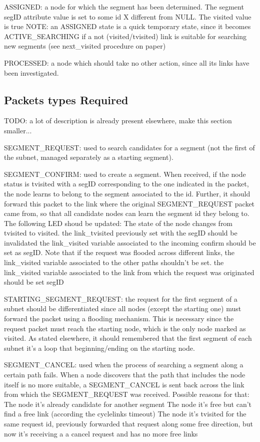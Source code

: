 \documentclass[conference]{IEEEtran}
\begin{document}
ASSIGNED: a node for which the segment has been determined.  The
segment segID attribute value is set to some id X different from NULL.
The visited value is true NOTE: an ASSIGNED state is a quick temporary
state, since it becomes ACTIVE\_SEARCHING if a not (visited/tvisited)
link is suitable for searching new segments (see next\_visited
procedure on paper) 

PROCESSED: a node which should take no other
action, since all its links have been investigated. 

\subsection{Packets types Required}
TODO: a lot of description is already present elsewhere, make this
section smaller...

SEGMENT\_REQUEST: used to search candidates for a segment (not the
first of the subnet, managed separately as a starting segment).

SEGMENT\_CONFIRM: used to create a segment. When received, if the node
status is tvisited with a segID corresponding to the one indicated in
the packet, the node learns to belong to the segment associated to the
id. Further, it should forward this packet to the link where the
original SEGMENT\_REQUEST packet came from, so that all candidate nodes
can learn the segment id they belong to. The following LED shoud be
updated: The state of the node changes from tvisited to visited.  the
link\_tvisited previously set with the segID should be invalidated the
link\_visited variable associated to the incoming confirm should be set
as segID. Note that if the request was flooded across different links,
the link\_visited variable associated to the other paths shouldn’t be
set.  the link\_visited variable associated to the link from which the
request was originated should be set segID

STARTING\_SEGMENT\_REQUEST: the request for the first segment of a
subnet should be differentiated since all nodes (except the starting
one) must forward the packet using a flooding mechanism. This is
necessary since the request packet must reach the starting node, which
is the only node marked as visited. As stated elsewhere, it should
remembered that the first segment of each subnet it's  a loop that
beginning/ending on the starting node.


SEGMENT\_CANCEL: used when the process of searching a segment along a
certain path fails. When a node discovers that the path that includes
the node itself is no more suitable, a SEGMENT\_CANCEL is sent back
across the link from which the SEGMENT\_REQUEST was received.  Possible
reasons for that: The node it’s already candidate for another segment
The node it’s free but can’t find a free link (according the
cyclelinks timeout) The node it’s tvisited for the same request id,
previously forwarded that request along some free direction, but now
it’s receiving a a cancel request and has no more free links
\end{document}
